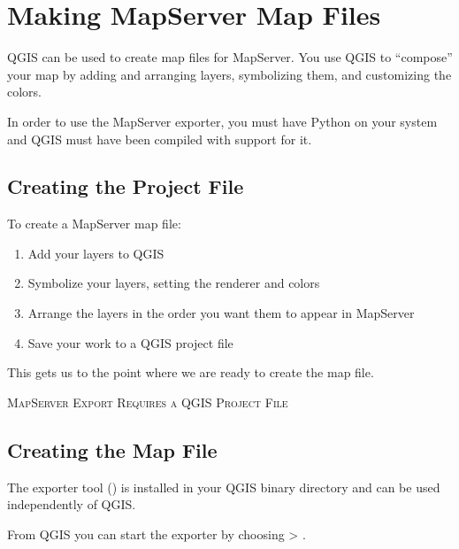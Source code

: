\section{Making MapServer Map Files}\label{sec:mapserver_export}

QGIS can be used to create map files for MapServer. You use QGIS to
``compose'' your map by adding and arranging layers, symbolizing them, and
customizing the colors.

In order to use the MapServer exporter, you must have Python on your
system and QGIS must have been compiled with support for it.

\subsection{Creating the Project File}

To create a MapServer map file:

\begin{enumerate}
\item Add your layers to QGIS
\item Symbolize your layers, setting the renderer and colors
\item Arrange the layers in the order you want them to appear in MapServer
\item Save your work to a QGIS project file
\end{enumerate} 

This gets us to the point where we are ready to create the map file.

\begin{Tip}\caption{\textsc{MapServer Export Requires a QGIS Project File}}
\end{Tip} 

\subsection{Creating the Map File}

The exporter tool () is installed in your QGIS binary directory and can be used independently of QGIS. 

From QGIS you can start the exporter by choosing  > . 

